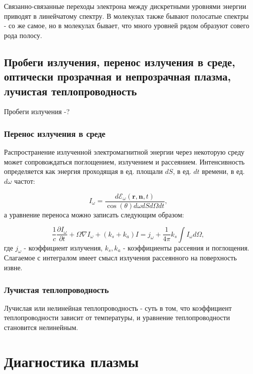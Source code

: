 \documentclass[10pt, a4paper]{article}
\numberwithin{equation}{section}
\begin{document}
Связанно-связанные переходы электрона между дискретными уровнями энергии приводят в линейчатому спектру. В молекулах также
бывают полосатые спектры - со же самое, но в молекулах бывает, что много уровней рядом образуют совего рода полосу.

\subsection{Пробеги излучения, перенос излучения в среде, оптически прозрачная и непрозрачная плазма, лучистая теплопроводность}
Пробеги излучения -?

\subsubsection{Перенос излучения в среде}
Распространение излученной электромагнитной энергии через некоторую среду может сопровождаться поглощением, излучением и рассеянием. Интенсивность определяется как энергия проходящая в ед. площали $dS$, в ед. $dt$ времени, в ед. $d\omega$ частот:

\begin{equation}
    \label{alfven}
    I_{\omega} = \frac{d\mathcal{E}_{\omega}(\mathbf{r},\mathbf{n},t)}{\cos(\theta)d\omega dSd\Omega dt},
\end{equation}
а уравнение переноса можно записать следующим образом:

\begin{equation}
    \label{alfven}
    \frac{1}{c} \frac{\partial I_{\omega}}{\partial t} + \mathcal{\Omega}\nabla I_{\omega} + (k_s + k_a) I = j_{\omega} + \frac{1}{4\pi} k_s \int I_{\omega} d\Omega,
\end{equation}
где $j_{\omega}$ - коэффициент излучения, $k_s, k_a$ - коэффициенты рассеяния и поглощения. Слагаемое с интегралом имеет смысл излучения рассеянного на поверхность извне.

\subsubsection{Лучистая теплопроводность}

Лучислая или нелинейная теплопроводность - суть в том, что коэффициент теплопроводности зависит от температуры, и уравнение теплопроводности становится нелинейным.


\section{Диагностика плазмы}
\label{sec.11}
\end{document}
